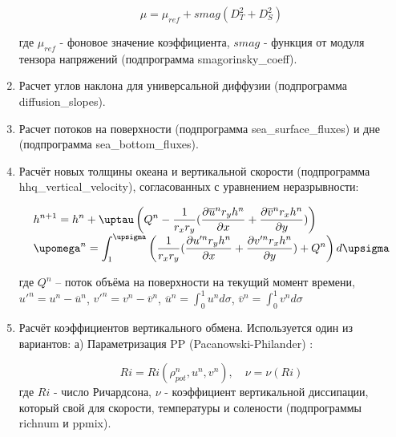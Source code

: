 \begin{enumerate}
\begin{equation} \label{eq:inmsom/13} 
\displaystyle{ \mu =\mu _{ref} +smag(D_{T}^{2} +D_{S}^{2} ) } 
\end{equation} 

где $\mu_{ref}$ - фоновое значение коэффициента, $smag$ - функция от модуля тензора напряжений (подпрограмма smagorinsky\_coeff).

\item  Расчет углов наклона для универсальной диффузии (подпрограмма diffusion\_slopes).

\item  Расчет потоков на поверхности (подпрограмма sea\_surface\_fluxes) и дне (подпрограмма sea\_bottom\_fluxes).

\item Расчёт новых толщины океана и вертикальной скорости (подпрограмма hhq\_vertical\_velocity), согласованных с уравнением неразрывности:

\begin{equation} \label{eq:inmsom/14} 
\begin{array}{l} 
\displaystyle{ h^{n+1} = h^n + \tau \left( Q^n - \frac{1}{r_x r_y}(\d{\overline{u}^n r_y h^n}{x} + \d{\overline{v}^n r_x h^n}{y}) \right) } \\
 
\displaystyle{ \omega^n = \int_1^\sigma \left( \frac{1}{r_x r_y}(\d{u'^n r_y h^n}{x} + \d{v'^n r_x h^n}{y}) + Q^n \right) d\sigma  }
\end{array} 
\end{equation} 

где $Q^n$ – поток объёма на поверхности на текущий момент времени, 
$u'^n = u^n - \overline{u}^n$, $v'^n = v^n - \overline{v}^n$,
$\overline{u}^n = \int_0^1 u^n d \sigma$, $\overline{v}^n = \int_0^1 v^n d \sigma$
 
\item Расчёт коэффициентов вертикального обмена. Используется один из вариантов:
	а) Параметризация PP (Pacanowski-Philander) \cite{ParameterizationofVerticalMixing}:
	
	\begin{equation} \label{eq:inmsom/15}
	  \displaystyle { Ri = Ri(\rho _{pot} ^{n} ,u^{n} ,v^{n} ),\quad \nu = \nu(Ri) }
	\end{equation}
	где $Ri$ - число Ричардсона, $\nu $ - коэффициент вертикальной диссипации, который 	свой для скорости, температуры и солености 
	(подпрограммы richnum и ppmix).
	
	

\end{enumerate}
